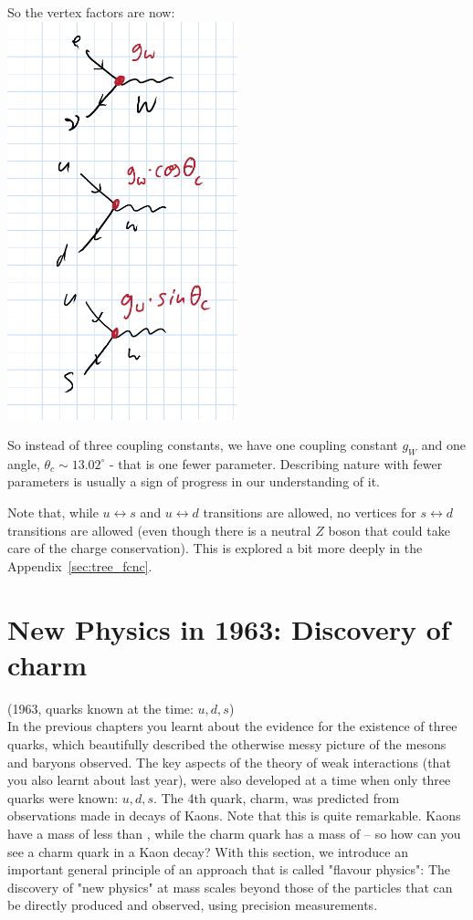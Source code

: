  So the vertex factors are now:\\
 \includegraphics[width=0.5\textwidth]{fig/weak/gWCabibbo}
 
 So instead of three coupling constants, we have one coupling constant
 $g_W$ and one angle, $\theta_c \sim 13.02^{\circ}$ - that is one
 fewer parameter. Describing nature with fewer parameters is usually a
 sign of progress in our understanding of it.
 
 Note that, while $u \leftrightarrow s$ and $u \leftrightarrow d$
 transitions are allowed, no vertices for $s \leftrightarrow d$
 transitions are allowed (even though there is a neutral $Z$ boson
 that could take care of the charge conservation). This is explored a
 bit more deeply in the Appendix~\ref{sec:tree_fcnc}.

\section{New Physics in 1963: Discovery of charm}
 (1963, quarks known at the time: $u, d, s$)\\ In the previous
chapters you learnt about the evidence for the existence of three
quarks, which beautifully described the otherwise messy picture of the
mesons and baryons observed. The key aspects of the theory of weak
interactions (that you also learnt about last year), were also
developed at a time when only three quarks were known: $u, d, s$. The
4th quark, charm, was predicted from observations made in decays of
Kaons. Note that this is quite remarkable. Kaons have a mass of less
than , while the charm quark has a mass of 
-- so how can you see a charm quark in a Kaon decay? With this
section, we introduce an important general principle of an approach
that is called "flavour physics": The discovery of "new physics" at
mass scales beyond those of the particles that can be directly
produced and observed, using precision measurements.



